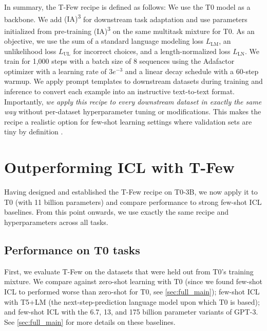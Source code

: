 In summary, the {\selectfont T-Few} recipe is defined as follows: We use the T0 model as a backbone. We add {\selectfont (IA)\textsuperscript{3}} for downstream task adaptation and use parameters initialized from pre-training {\selectfont (IA)\textsuperscript{3}} on the same multitask mixture for T0. As an objective, we use the sum of a standard language modeling loss $L_\mathrm{LM}$, an unlikelihood loss $L_\mathrm{UL}$ for incorrect choices, and a length-normalized loss $L_\mathrm{LN}$.
We train for 1,000 steps with a batch size of 8 sequences using the Adafactor optimizer \cite{shazeer2018adafactor} with a learning rate of $3e^{-3}$ and a linear decay schedule with a 60-step warmup. We apply prompt templates to downstream datasets during training and inference to convert each example into an instructive text-to-text format. Importantly, \textit{we apply this recipe to every downstream dataset in exactly the same way} without per-dataset hyperparameter tuning or modifications. This makes the recipe a realistic option for few-shot learning settings where validation sets are tiny by definition \cite{perez2021true,oliver2018realistic}.

\section{Outperforming ICL with {\selectfont T-Few}}
\label{sec:experiments}

Having designed and established the {\selectfont T-Few} recipe on T0-3B, we now apply it to T0 (with 11 billion parameters) and compare performance to strong few-shot ICL baselines. From this point onwards, we use exactly the same recipe and hyperparameters across all tasks.

\subsection{Performance on T0 tasks}

First, we evaluate {\selectfont T-Few} on the datasets that were held out from T0's training mixture. We compare against zero-shot learning with T0 \cite{sanh2021multitask} (since we found few-shot ICL to performed worse than zero-shot for T0, see \ref{sec:full_main}); few-shot ICL with T5+LM \cite{lester2021power} (the next-step-prediction language model upon which T0 is based); and few-shot ICL with the 6.7, 13, and 175 billion parameter variants of GPT-3. See \ref{sec:full_main} for more details on these baselines.

